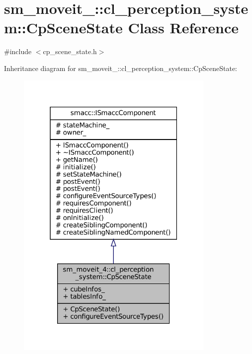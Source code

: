 \hypertarget{classsm__moveit__4_1_1cl__perception__system_1_1CpSceneState}{}\section{sm\+\_\+moveit\+\_\+:\+:cl\+\_\+perception\+\_\+system\+:\+:Cp\+Scene\+State Class Reference}
\label{classsm__moveit__4_1_1cl__perception__system_1_1CpSceneState}


{\ttfamily \#include $<$cp\+\_\+scene\+\_\+state.\+h$>$}



Inheritance diagram for sm\+\_\+moveit\+\_\+:\+:cl\+\_\+perception\+\_\+system\+:\+:Cp\+Scene\+State\+:
\nopagebreak
\begin{figure}[H]
\begin{center}
\leavevmode
\includegraphics[width=271pt]{classsm__moveit__4_1_1cl__perception__system_1_1CpSceneState__inherit__graph}
\end{center}
\end{figure}


